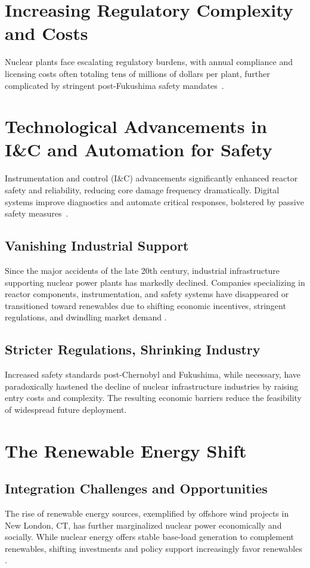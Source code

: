 \documentclass[12pt]{article}
\begin{document}
\section{Increasing Regulatory Complexity and Costs}
Nuclear plants face escalating regulatory burdens, with annual compliance and licensing costs often totaling tens of millions of dollars per plant, further complicated by stringent post-Fukushima safety mandates~\cite{AAFNuclearCosts}.

\section{Technological Advancements in I\&C and Automation for Safety}
Instrumentation and control (I\&C) advancements significantly enhanced reactor safety and reliability, reducing core damage frequency dramatically. Digital systems improve diagnostics and automate critical responses, bolstered by passive safety measures~\cite{NRCIandC,MIT2020}.

\subsection{Vanishing Industrial Support}
Since the major accidents of the late 20th century, industrial infrastructure supporting nuclear power plants has markedly declined. Companies specializing in reactor components, instrumentation, and safety systems have disappeared or transitioned toward renewables due to shifting economic incentives, stringent regulations, and dwindling market demand \cite{shirvan2024cost}.

\subsection{Stricter Regulations, Shrinking Industry}
Increased safety standards post-Chernobyl and Fukushima, while necessary, have paradoxically hastened the decline of nuclear infrastructure industries by raising entry costs and complexity. The resulting economic barriers reduce the feasibility of widespread future deployment.

\section{The Renewable Energy Shift}

\subsection{Integration Challenges and Opportunities}
The rise of renewable energy sources, exemplified by offshore wind projects in New London, CT, has further marginalized nuclear power economically and socially. While nuclear energy offers stable base-load generation to complement renewables, shifting investments and policy support increasingly favor renewables \cite{abdussami2025future}.
\end{document}
